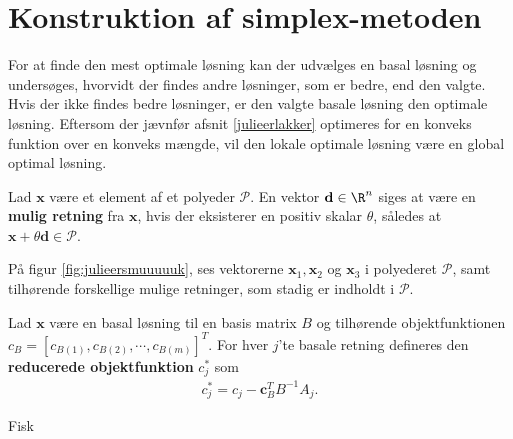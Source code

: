 %
\section{Konstruktion af simplex-metoden}
%
For at finde den mest optimale løsning kan der udvælges en basal løsning og undersøges, hvorvidt der findes andre løsninger, som er bedre, end den valgte. 
Hvis der ikke findes bedre løsninger, er den valgte basale løsning den optimale løsning. 
Eftersom der jævnfør afsnit \ref{julieerlakker} optimeres for en konveks funktion over en konveks mængde, %
vil den lokale optimale løsning være en global optimal løsning. 
%
%
\begin{defn}{}{}
Lad $\textbf{x}$ være et element af et polyeder $\mathcal{P}$.
En vektor $\textbf{d}\in \R^n$ siges at være en  \textbf{mulig retning} fra $\textbf{x}$, hvis der eksisterer en positiv skalar $\theta$, således at $\textbf{x}+\theta \textbf{d}\in \mathcal{P}$.
\end{defn}
\noindent
%
På figur \ref{fig:julieersmuuuuuk}, ses vektorerne $\mathbf{x}_1, \mathbf{x}_2$ og $\mathbf{x}_3$ i polyederet $\mathcal{P}$, samt tilhørende forskellige mulige retninger, som stadig er indholdt i $\mathcal{P}$.
%

%
%
%
\begin{defn}{}{}
Lad $\mathbf{x}$ være en basal løsning til en basis matrix $B$ og tilhørende objektfunktionen $c_B=[ c_{B(1)},c_{B(2)}, \cdots , c_{B(m)} ]^T.$
For hver $j$'te basale retning defineres den \textbf{reducerede objektfunktion} $c_j^*$ som
\begin{align*}
c_j^* = c_j - \mathbf{c}_B^T B^{-1}A_j.
\end{align*} 
%
\end{defn}
\noindent
%
Fisk
%

